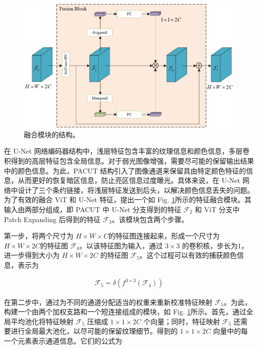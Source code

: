 \documentclass[a4paper, 10pt]{article}
\begin{document}
		\begin{figure}[htb]
			\centering 
			\includegraphics[width=0.7\columnwidth]{picture/LLIE/My Architecture/Fusion Block}
			\caption{
				\label{fig: Fusion Block} 
				融合模块的结构。
			}
		\end{figure}
		
		在 U-Net 网络编码器结构中，浅层特征包含丰富的纹理信息和颜色信息，多层卷积得到的高层特征包含全局信息。对于弱光图像增强，需要尽可能的保留输出结果中的颜色信息。为此，PACUT 结构引入了图像通道来保留具由特定颜色特征的信息，从而更好的恢复暗区信息，防止亮区信息过度曝光。具体来说，在 U-Net 网络中设计了三个条约链接，将浅层特征发送到后头，以解决颜色信息丢失的问题。为了有效的融合 ViT 和 U-Net 特征，提出一个如 Fig. \ref{fig: Fusion Block}所示的特征融合模块。其输入由两部分组成，即 PACUT 中 U-Net 分支得到的特征 $\mathcal{F_2}$ 和 ViT 分支中 Patch Expanding 后得到的特征 $\mathcal{F_3}$。该模块包含两个步骤。
		
		第一步，将两个尺寸为 $H \times W \times C$的特征图连接起来，形成一个尺寸为 $H \times W \times 2C$的特征图 $\mathcal{F}_4$。以该特征图为输入，通过 $3 \times 3$ 的卷积核，步长为1，进一步得到大小为 $H \times W \times 2C$ 的特征图 $\mathcal{F}_5$。这个过程可以有效的捕获颜色信息，表示为 
		
		\begin{equation}
			\begin{aligned}
				\mathcal{F}_5 = \delta \left( f^{3 \times 3} (\mathcal{F}_4)\right)
			\end{aligned}
			\label{eq: capture color information}
		\end{equation}
		
		在第二步中，通过为不同的通道分配适当的权重来重新校准特征映射 $\mathcal{F}_5$。为此，构建一个由两个加权支路和一个短连接组成的模块，如 Fig. \ref{fig: Fusion Block}所示。首先，通过全局平均池化将特征映射 $\mathcal{F}_5$ 压缩成 $1 \times 1 \times 2C$ 个向量；同时，特征映射 $\mathcal{F}_5$ 还需要进行全局最大池化，以尽可能的保留纹理细节。得到的 $1 \times 1 \times 2C$ 向量中的每一个元素表示通道信息。它们的公式为
		
\end{document}
